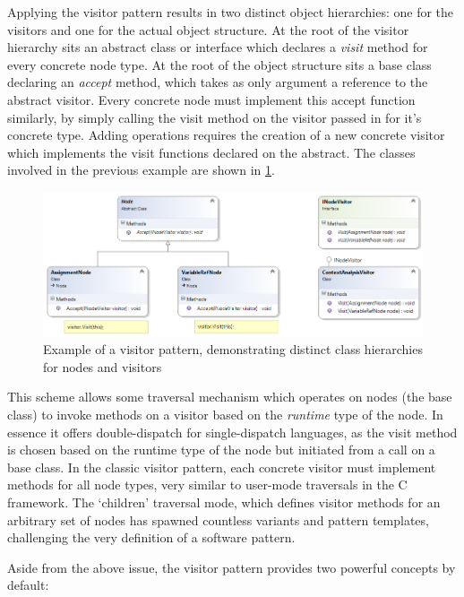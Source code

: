 \documentclass[twoside,openright]{uva-bachelor-thesis}
\begin{document}
			Applying the visitor pattern results in two distinct object hierarchies: one for the visitors and one for the actual object structure. At the root of the visitor hierarchy sits an abstract class or interface which declares a \emph{visit} method for every concrete node type. At the root of the object structure sits a base class declaring an \emph{accept} method, which takes as only argument a reference to the abstract visitor. Every concrete node must implement this accept function similarly, by simply calling the visit method on the visitor passed in for it's concrete type. Adding operations requires the creation of a new concrete visitor which implements the visit functions declared on the abstract. The classes involved in the previous example are shown in \cref{visitor-example}.
			
			\begin{figure}
				\includegraphics[width=1\textwidth]{figures/visitor/Modern.png}
				\caption{Example of a visitor pattern, demonstrating distinct class hierarchies for nodes and visitors}
				\label{visitor-example}
			\end{figure}
			
			This scheme allows some traversal mechanism which operates on nodes (the base class) to invoke methods on a visitor based on the \emph{runtime} type of the node. In essence it offers double-dispatch for single-dispatch languages, as the visit method is chosen based on the runtime type of the node but initiated from a call on a base class. In the classic visitor pattern, each concrete visitor must implement methods for all node types, very similar to user-mode traversals in the C framework. The `children' traversal mode, which defines visitor methods for an arbitrary set of nodes has spawned countless variants and pattern templates, challenging the very definition of a software pattern\cite{nordberg1996,palsberg1998essence,bishop2008efficiency}.
			
			Aside from the above issue, the visitor pattern provides two powerful concepts by default:
\end{document}
